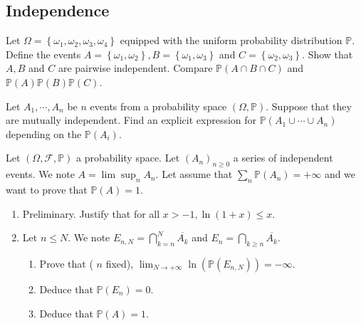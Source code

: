 \begin{center}
    \section*{Independence}
\end{center}

\begin{Exercise}
     Let $\Omega=\left\{\omega_{1}, \omega_{2}, \omega_{3}, \omega_{4}\right\}$ equipped with the uniform probability distribution $\mathbb{P}$. Define the events $A=\left\{\omega_{1}, \omega_{2}\right\}, B=\left\{\omega_{1}, \omega_{3}\right\}$ and $C=\left\{\omega_{2}, \omega_{3}\right\}$. Show that $A, B$ and $C$ are pairwise independent. Compare $\mathbb{P}(A \cap B \cap C)$ and $\mathbb{P}(A) \mathbb{P}(B) \mathbb{P}(C)$.
\end{Exercise}

\begin{Exercise}
Let $A_1, \cdots , A_n$ be $n$ events from a probability space $(\Omega, \mathbb{P})$.
Suppose that they are mutually independent. Find an explicit expression for $\mathbb{P}(A_1 \cup \cdots \cup A_n)$ depending on the $\mathbb{P}(A_i)$.
\end{Exercise}

\begin{Exercise}
  Let $(\Omega, \mathcal{F}, \mathbb{P})$ a probability space. Let $\left(A_n\right)_{n \geq 0}$ a series of independent events. We note $A=\lim \sup _n A_n$. Let assume that $\sum_n \mathbb{P}\left(A_n\right)=+\infty$ and we want to prove that $\mathbb{P}(A)=1$.
  \begin{enumerate}
    \item Preliminary. Justify that for all $x>-1, \ln (1+x) \leq x$.
    \item Let $n \leq N$. We note $E_{n, N}=\bigcap_{k=n}^N \overline{A_k}$ and $E_n=\bigcap_{k \geq n} \overline{A_k}$.
    \begin{enumerate}
      \item Prove that ( $n$ fixed), $\lim _{N \rightarrow+\infty} \ln \left(\mathbb{P}\left(E_{n, N}\right)\right)=-\infty$.
      \item Deduce that $\mathbb{P}\left(E_n\right)=0$.
      \item Deduce that $\mathbb{P}(A)=1$.
    \end{enumerate}
  \end{enumerate}
\end{Exercise}
